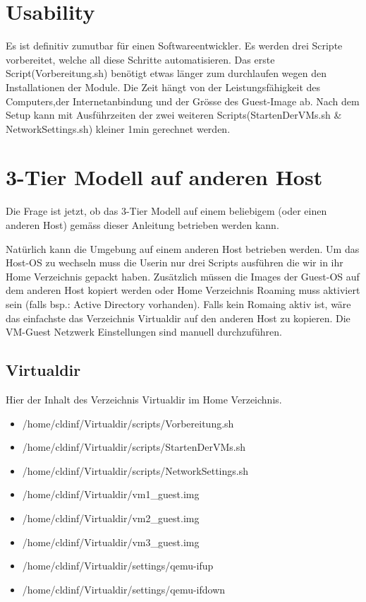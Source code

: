\documentclass[a4,12pt]{scrartcl}
\begin{document}
\section{Usability}
Es ist definitiv zumutbar für einen Softwareentwickler. Es werden drei Scripte vorbereitet, welche all diese Schritte automatisieren. Das erste Script(Vorbereitung.sh) benötigt etwas länger zum durchlaufen wegen den Installationen der Module. Die Zeit hängt von der Leistungsfähigkeit des Computers,der Internetanbindung und der Grösse des Guest-Image ab. Nach dem Setup kann mit Ausführzeiten der zwei weiteren Scripts(StartenDerVMs.sh \& NetworkSettings.sh) kleiner 1min gerechnet werden. 

\section{3-Tier Modell auf anderen Host}
Die Frage ist jetzt, ob das 3-Tier Modell auf einem beliebigem (oder einen anderen Host) gemäss dieser Anleitung betrieben werden kann. 

\noindent Natürlich kann die Umgebung auf einem anderen Host betrieben werden. Um das Host-OS zu wechseln muss die Userin nur drei Scripts ausführen die wir in ihr Home Verzeichnis gepackt haben. Zusätzlich müssen die Images der Guest-OS auf dem anderen Host kopiert werden oder Home Verzeichnis Roaming muss aktiviert sein (falls bsp.: Active Directory vorhanden). Falls kein Romaing aktiv ist, wäre das einfachste das Verzeichnis Virtualdir auf den anderen Host zu kopieren. Die VM-Guest Netzwerk Einstellungen sind manuell durchzuführen. 

\subsection{Virtualdir}
Hier der Inhalt des Verzeichnis Virtualdir im Home Verzeichnis. 
\begin{itemize}
\item /home/cldinf/Virtualdir/scripts/Vorbereitung.sh
\item /home/cldinf/Virtualdir/scripts/StartenDerVMs.sh 
\item /home/cldinf/Virtualdir/scripts/NetworkSettings.sh
\item /home/cldinf/Virtualdir/vm1\_guest.img
\item /home/cldinf/Virtualdir/vm2\_guest.img
\item /home/cldinf/Virtualdir/vm3\_guest.img 
\item /home/cldinf/Virtualdir/settings/qemu-ifup
\item /home/cldinf/Virtualdir/settings/qemu-ifdown
\end{itemize}
\end{document}

